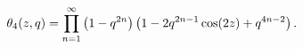 \[\mathop{\theta_{4}\/}\nolimits\!\left(z,q\right)=\prod\limits_{n=1}^{\infty}%
\left(1-q^{2n}\right)\left(1-2q^{2n-1}\mathop{\cos\/}\nolimits\!\left(2z\right%
)+q^{4n-2}\right).\]